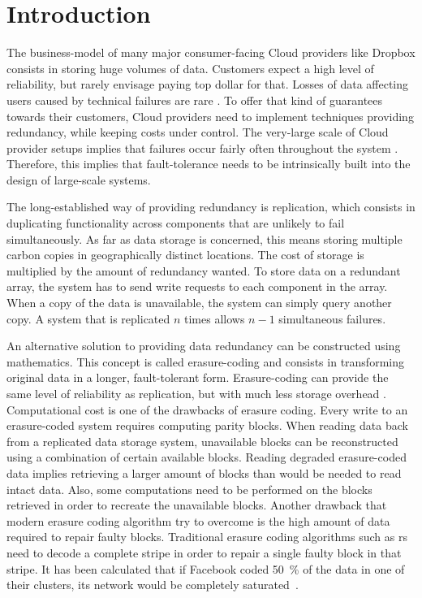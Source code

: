 \section{Introduction}

The business-model of many major consumer-facing Cloud providers like Dropbox consists in storing huge volumes of data.
Customers expect a high level of reliability, but rarely envisage paying top dollar for that.
Losses of data affecting users caused by technical failures are rare \autocite{racs}.
To offer that kind of guarantees towards their customers, Cloud providers need to implement techniques providing redundancy, while keeping costs under control.
The very-large scale of Cloud provider setups implies that failures occur fairly often throughout the system \autocite{failures-study}.
Therefore, this implies that fault-tolerance needs to be intrinsically built into the design of large-scale systems.

The long-established way of providing redundancy is replication, which consists in duplicating functionality across components that are unlikely to fail simultaneously.  As far as data storage is concerned, this means storing multiple carbon copies in geographically distinct locations.
The cost of storage is multiplied by the amount of redundancy wanted.
To store data on a redundant array, the system has to send write requests to each component in the array.
When a copy of the data is unavailable, the system can simply query another copy.
A system that is replicated $n$ times allows $n-1$ simultaneous failures.

An alternative solution to providing data redundancy can be constructed using mathematics.
This concept is called erasure-coding and consists in transforming original data in a longer, fault-tolerant form.
Erasure-coding can provide the same level of reliability as replication, but with much less storage overhead \autocite{Weatherspoon2002}.
Computational cost is one of the drawbacks of erasure coding.
Every write to an erasure-coded system requires computing parity blocks.
When reading data back from a replicated data storage system, unavailable blocks can be reconstructed using a combination of certain available blocks.
Reading degraded erasure-coded data implies retrieving a larger amount of blocks than would be needed to read intact data.
Also, some computations need to be performed on the blocks retrieved in order to recreate the unavailable blocks.
Another drawback that modern erasure coding algorithm try to overcome is the high amount of data required to repair faulty blocks.
Traditional erasure coding algorithms such as \ac{rs} need to decode a complete stripe in order to repair a single faulty block in that stripe.
It has been calculated that if Facebook coded \SI{50}{\percent} of the data in one of their clusters, its network would be completely saturated~\autocite{XorbasVLDB}.

